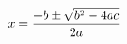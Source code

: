 \documentclass[preview]{standalone}
\begin{document}
\begin{align*}
x = { - b \pm \sqrt { b ^2 - 4 a c } \over 2 a }
\end{align*}
\end{document}
